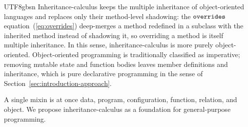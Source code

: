 \begin{CJK*}{UTF8}{gbsn}
Inheritance-calculus keeps the multiple inheritance of
object-oriented languages and replaces only their method-level
shadowing: the $\mathtt{overrides}$ equation~(\ref{eq:overrides})
deep-merges a method redefined in a subclass with the inherited
method instead of shadowing it, so overriding a method is itself
multiple inheritance.
In this sense, inheritance-calculus is more purely object-oriented.
Object-oriented programming is traditionally classified as
imperative; removing mutable state and function bodies leaves
member definitions and inheritance, which is pure declarative
programming in the sense of Section~\ref{sec:introduction-approach}.

A single mixin is at once data, program, configuration, function, relation,
and object. We propose inheritance-calculus as a foundation for
general-purpose programming.
\fi

\end{CJK*}
